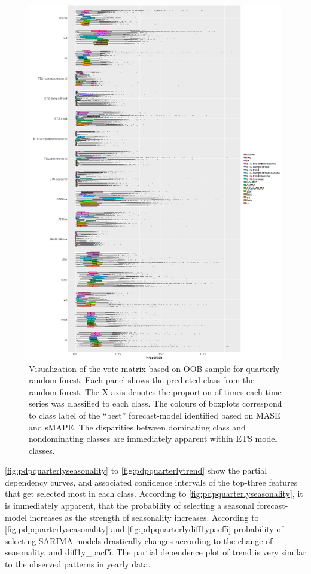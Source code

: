 \documentclass[11pt,a4paper,]{article}
\begin{document}
\begin{figure}
\centering
\includegraphics{figures/oobquarterly-1.png}
\caption{\label{fig:oobquarterly}Visualization of the vote matrix based on OOB sample for quarterly random forest. Each panel shows the predicted class from the random forest. The X-axis denotes the proportion of times each time series was classified to each class. The colours of boxplots correspond to class label of the ``best'' forecast-model identified based on MASE and sMAPE. The disparities between dominating class and nondominating classes are immediately apparent within ETS model classes.}
\end{figure}

\autoref{fig:pdpquarterlyseasonality} to \autoref{fig:pdpquarterlytrend} show the partial dependency curves, and associated confidence intervals of the top-three features that get selected most in each class. According to \autoref{fig:pdpquarterlyseasonality}, it is immediately apparent, that the probability of selecting a seasonal forecast-model increases as the strength of seasonality increases. According to \autoref{fig:pdpquarterlyseasonality} and \autoref{fig:pdpquarterlydiff1ypacf5} probability of selecting SARIMA models drastically changes according to the change of seasonality, and diff1y\_pacf5. The partial dependence plot of trend is very similar to the observed patterns in yearly data.
\end{document}
